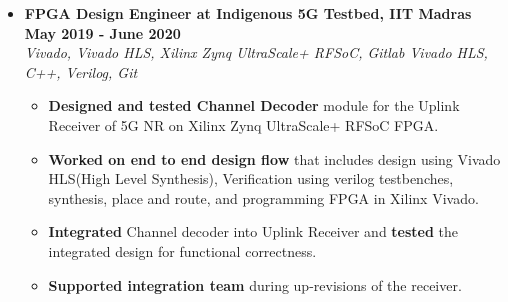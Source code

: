 \documentclass[a4paper,11pt]{article}
\newcommand{\isep}{-2 pt}
\newcommand{\spsep}{-0.75cm}
\begin{document}
\begin{itemize}
	\item \textbf{FPGA Design Engineer at Indigenous 5G Testbed, IIT Madras \hfill May 2019 - June 2020} \\
	\emph{Vivado, Vivado HLS, Xilinx Zynq UltraScale+ RFSoC, Gitlab \hfill Vivado HLS, C++, Verilog, Git} \\[\spsep]
	\begin{itemize} \itemsep \isep
		\item \textbf{Designed and tested Channel Decoder} module for the Uplink Receiver of 5G NR on Xilinx Zynq UltraScale+ RFSoC FPGA.
		\item \textbf{Worked on end to end design flow} that includes design using Vivado HLS(High Level Synthesis), Verification using verilog testbenches, synthesis, place and route, and programming FPGA in Xilinx Vivado. 
		\item \textbf{Integrated} Channel decoder into Uplink Receiver and \textbf{tested} the integrated design for functional correctness.
		\item \textbf{Supported integration team} during up-revisions of the receiver.
	\end{itemize}



\end{itemize}
\end{document}
